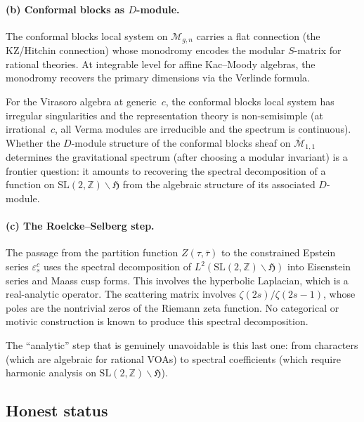 \documentclass[11pt]{article}
\newcommand{\cM}{\mathcal{M}}
\newcommand{\Z}{\mathbb{Z}}
\begin{document}
\paragraph{(b) Conformal blocks as $D$-module.}
The conformal blocks local system on $\cM_{g,n}$ carries a flat
connection (the KZ/Hitchin connection) whose monodromy encodes
the modular $S$-matrix for rational theories.  At integrable
level for affine Kac--Moody algebras, the monodromy recovers the
primary dimensions via the Verlinde formula.

For the Virasoro algebra at generic~$c$, the conformal blocks
local system has irregular singularities and the representation
theory is non-semisimple (at irrational~$c$, all Verma modules
are irreducible and the spectrum is continuous).  Whether the
$D$-module structure of the conformal blocks sheaf on
$\overline{\cM}_{1,1}$ determines the gravitational spectrum
(after choosing a modular invariant) is a frontier question:
it amounts to recovering the spectral decomposition of a
function on $\mathrm{SL}(2,\Z)\backslash\mathfrak{H}$ from
the algebraic structure of its associated $D$-module.

\paragraph{(c) The Roelcke--Selberg step.}
The passage from the partition function
$Z(\tau,\bar\tau)$ to the constrained Epstein series
$\varepsilon^c_s$ uses the spectral decomposition of
$L^2(\mathrm{SL}(2,\Z)\backslash\mathfrak{H})$ into Eisenstein
series and Maass cusp forms.  This involves the hyperbolic
Laplacian, which is a real-analytic operator.
The scattering matrix involves $\zeta(2s)/\zeta(2s-1)$,
whose poles are the nontrivial zeros of the Riemann
zeta function.  No categorical or motivic construction is
known to produce this spectral decomposition.

The ``analytic'' step that is genuinely unavoidable is this
last one: from characters (which are algebraic for rational VOAs)
to spectral coefficients (which require harmonic analysis on
$\mathrm{SL}(2,\Z)\backslash\mathfrak{H}$).

\subsection{Honest status}
\end{document}
